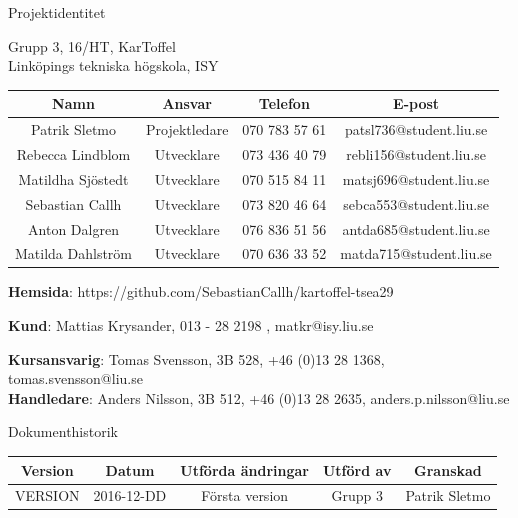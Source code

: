 \documentclass{article}
\begin{document}
\vspace*{\fill}
{
\sffamily
\centering
\large


{\huge
Projektidentitet
}

{\large
Grupp 3, 16/HT, KarToffel \\ Linköpings tekniska högskola, ISY
}

\vspace{0.5cm}

\begin{table}[H]
\centering
\begin{tabular}{ | c | c | c | c |}
\hline
Namn & Ansvar & Telefon & E-post \\
\hline
Patrik Sletmo & Projektledare & 070 783 57 61 & patsl736@student.liu.se \\
\hline
Rebecca Lindblom & Utvecklare & 073 436 40 79 & rebli156@student.liu.se \\
\hline
Matildha Sjöstedt & Utvecklare & 070 515 84 11 & matsj696@student.liu.se \\
\hline
Sebastian Callh & Utvecklare & 073 820 46 64 & sebca553@student.liu.se \\
\hline
Anton Dalgren & Utvecklare & 076 836 51 56 & antda685@student.liu.se \\
\hline
Matilda Dahlström & Utvecklare & 070 636 33 52 & matda715@student.liu.se \\
\hline
\end{tabular}
\end{table}
}

\begin{center}
\textbf{Hemsida}: https://github.com/SebastianCallh/kartoffel-tsea29
\end{center}

\begin{center}
\textbf{Kund}: Mattias Krysander, 013 - 28 2198 , matkr@isy.liu.se
\end{center}

\begin{center}
\textbf{Kursansvarig}: Tomas Svensson, 3B 528, +46 (0)13 28 1368, tomas.svensson@liu.se \\
\textbf{Handledare}: Anders Nilsson, 3B 512, +46 (0)13 28 2635, anders.p.nilsson@liu.se
\end{center}
\vspace*{\fill}
\clearpage

\renewcommand*\contentsname{Innehållsförteckning}
\tableofcontents
\clearpage


{
\sffamily
\centering
\large


{\huge 
Dokumenthistorik \\
}
\begin{table}[H]
\centering
\begin{tabular}{ | c | c | c | c | c |} 
\hline
\textbf{Version} & \textbf{Datum} & \textbf{Utförda ändringar} & \textbf{Utförd av } & \textbf{Granskad} \\
\hline
VERSION & 2016-12-DD & Första version & Grupp 3 & Patrik Sletmo \\
\hline

\end{tabular}
\end{table}
}
\end{document}
